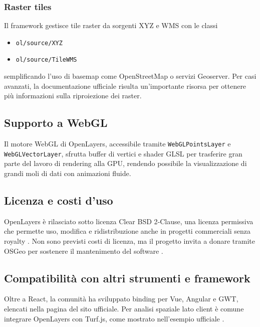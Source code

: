 \subsubsection*{Raster tiles}
Il framework gestisce tile raster da sorgenti XYZ e WMS con le classi

\begin{itemize}
  \item \texttt{ol/source/XYZ}

  \item \texttt{ol/source/TileWMS}
\end{itemize}

semplificando l'uso di basemap come OpenStreetMap o servizi Geoserver\cite{openlayers-raster-xyz}.
Per casi avanzati, la documentazione ufficiale risulta un'importante risorsa per
ottenere più informazioni sulla riproiezione dei raster.

\subsection{Supporto a WebGL}
Il motore WebGL di OpenLayers, accessibile tramite \texttt{WebGLPointsLayer} e \texttt{WebGLVectorLayer},
sfrutta buffer di vertici e shader GLSL per trasferire gran parte del lavoro di rendering
alla GPU, rendendo possibile la visualizzazione di grandi moli di dati con
animazioni fluide. \cite{openlayers-webgl-example,openlayers-webgl-workshop}

\subsection{Licenza e costi d'uso}
OpenLayers è rilasciato sotto licenza Clear BSD 2‑Clause, una licenza permissiva
che permette uso, modifica e ridistribuzione anche in progetti commerciali senza
royalty \cite{openlayers-github,ol-cesium-license}. Non sono previsti costi di licenza,
ma il progetto invita a donare tramite OSGeo per sostenere il mantenimento del
software \cite{openlayers-doc}.

\subsection{Compatibilità con altri strumenti e framework}
Oltre a React, la comunità ha sviluppato binding per Vue, Angular e GWT, elencati
nella pagina  del sito ufficiale. Per analisi spaziale
lato client è comune integrare OpenLayers con Turf.js, come mostrato nell'esempio
ufficiale  \cite{awesome-openlayers,openlayers-turf-example}.

\newpage